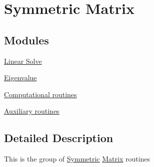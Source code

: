 \hypertarget{group__SY}{}\section{Symmetric Matrix}
\label{group__SY}
\subsection*{Modules}
\begin{DoxyCompactItemize}
\item 
\hyperlink{group__solveSY}{Linear Solve}
\item 
\hyperlink{group__eigenSY}{Eigenvalue}
\item 
\hyperlink{group__computationalSY}{Computational routines}
\item 
\hyperlink{group__auxiliarySY}{Auxiliary routines}
\end{DoxyCompactItemize}


\subsection{Detailed Description}
This is the group of \hyperlink{classSymmetric}{Symmetric} \hyperlink{classMatrix}{Matrix} routines 